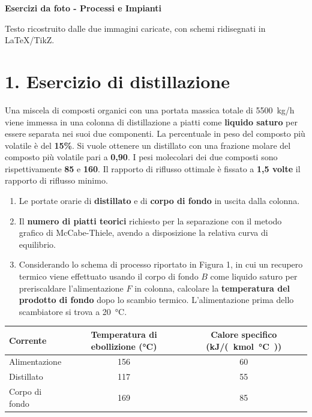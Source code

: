 \documentclass[11pt,a4paper]{article}
\newcommand{\titolo}[1]{\begin{center}\sffamily\bfseries\Large\color{SapienzaRed}#1\end{center}\vspace{2mm}}
\newcommand{\sottotitolo}[1]{\vspace{1mm}\noindent{\sffamily\bfseries\color{DarkBlue}#1}\par\vspace{1mm}}
\begin{document}
\titolo{Esercizi da foto - Processi e Impianti}
\begin{center}
\small Testo ricostruito dalle due immagini caricate, con schemi ridisegnati in \LaTeX/TikZ.
\end{center}
\vspace{3mm}

\section*{1. Esercizio di distillazione}

\begin{datibox}
Una miscela di composti organici con una portata massica totale di \SI{5500}{kg/h} viene immessa in una colonna di distillazione a piatti come \textbf{liquido saturo} per essere separata nei suoi due componenti. La percentuale in peso del composto più volatile è del \textbf{15\%}. Si vuole ottenere un distillato con una frazione molare del composto più volatile pari a \textbf{0,90}. I pesi molecolari dei due composti sono rispettivamente \textbf{85} e \textbf{160}. Il rapporto di riflusso ottimale è fissato a \textbf{1,5 volte} il rapporto di riflusso minimo.
\end{datibox}

\sottotitolo{Calcolare}
\begin{enumerate}[label=\arabic*.]
\item Le portate orarie di \textbf{distillato} e di \textbf{corpo di fondo} in uscita dalla colonna.
\item Il \textbf{numero di piatti teorici} richiesto per la separazione con il metodo grafico di McCabe-Thiele, avendo a disposizione la relativa curva di equilibrio.
\item Considerando lo schema di processo riportato in Figura 1, in cui un recupero termico viene effettuato usando il corpo di fondo \(B\) come liquido saturo per preriscaldare l'alimentazione \(F\) in colonna, calcolare la \textbf{temperatura del prodotto di fondo} dopo lo scambio termico. L'alimentazione prima dello scambiatore si trova a \SI{20}{\celsius}.
\end{enumerate}

\sottotitolo{Dati termici}
\begin{center}
\renewcommand{\arraystretch}{1.25}
\begin{tabularx}{0.92\textwidth}{lcc}
\toprule
\textbf{Corrente} & \textbf{Temperatura di ebollizione (\si{\celsius})} & \textbf{Calore specifico (\si{kJ/(kmol.\celsius)})} \\
\midrule
Alimentazione & 156 & 60 \\
Distillato & 117 & 55 \\
Corpo di fondo & 169 & 85 \\
\bottomrule
\end{tabularx}
\end{center}
\end{document}
